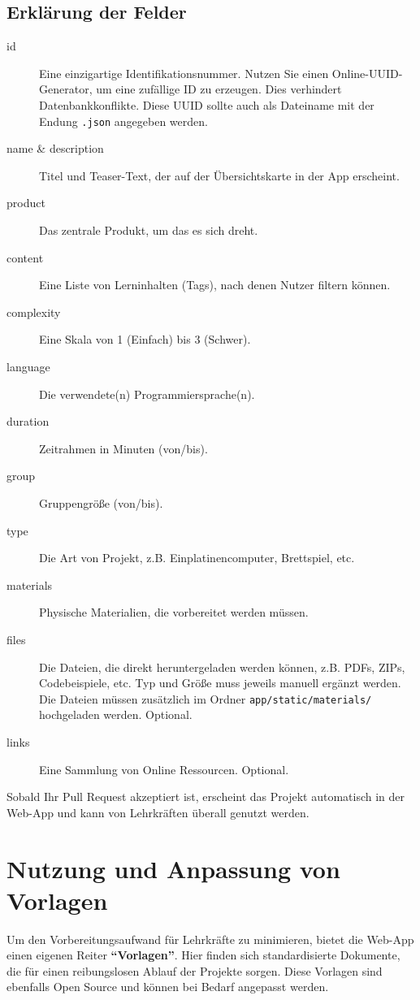 \documentclass[a5paper,pagesize,10pt,bibtotoc,pointlessnumbers,
normalheadings,DIV=9,twoside=false]{scrbook}
\begin{document}
\subsection*{Erklärung der Felder}
\begin{description}
    \item[id] Eine einzigartige Identifikationsnummer. Nutzen Sie einen Online-UUID-Generator, um eine zufällige ID zu erzeugen. Dies verhindert Datenbankkonflikte. Diese UUID sollte auch als Dateiname mit der Endung \texttt{.json} angegeben werden.
    \item[name \& description] Titel und Teaser-Text, der auf der Übersichtskarte in der App erscheint.
    \item[product] Das zentrale Produkt, um das es sich dreht.
    \item[content] Eine Liste von Lerninhalten (Tags), nach denen Nutzer filtern können.
    \item[complexity] Eine Skala von 1 (Einfach) bis 3 (Schwer).
    \item[language] Die verwendete(n) Programmiersprache(n).
    \item[duration] Zeitrahmen in Minuten (von/bis).
    \item[group] Gruppengröße (von/bis).
    \item[type] Die Art von Projekt, z.B. Einplatinencomputer, Brettspiel, etc. 
    \item[materials] Physische Materialien, die vorbereitet werden müssen.
    \item[files] Die Dateien, die direkt heruntergeladen werden können, z.B. PDFs, ZIPs, Codebeispiele, etc. Typ und Größe muss jeweils manuell ergänzt werden. Die Dateien müssen zusätzlich im Ordner \texttt{app/static/materials/} hochgeladen werden. Optional.
    \item[links] Eine Sammlung von Online Ressourcen. Optional.
\end{description}

Sobald Ihr Pull Request akzeptiert ist, erscheint das Projekt automatisch in der Web-App und kann von Lehrkräften überall genutzt werden.

\section*{Nutzung und Anpassung von Vorlagen}

Um den Vorbereitungsaufwand für Lehrkräfte zu minimieren, bietet die Web-App einen eigenen Reiter \textbf{``Vorlagen''}. Hier finden sich standardisierte Dokumente, die für einen reibungslosen Ablauf der Projekte sorgen. Diese Vorlagen sind ebenfalls Open Source und können bei Bedarf angepasst werden.
\end{document}
